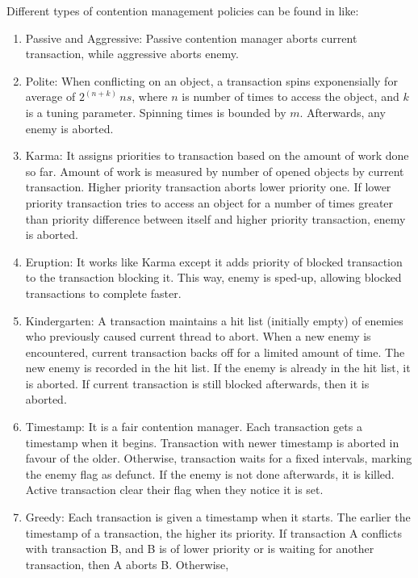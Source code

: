 \documentclass[12pt,english]{report}
\begin{document}
Different types of contention management policies can be found in
\cite{Scherer:2005:ACM:1073814.1073861,scherer2004contention,Spear:2009:CSC:1504176.1504199,springerlink:10.1007_11561927_23,Guerraoui:2005:TTT:1073814.1073863,Guerraoui:2006:TTT:1146381.1146429}
like:
\begin{enumerate}
\item Passive and Aggressive: Passive contention manager aborts current transaction,
while aggressive aborts enemy.
\item Polite: When conflicting on an object, a transaction spins exponensially
for average of $2^{(n+k)}\, ns$, where $n$ is number of times to
access the object, and $k$ is a tuning parameter. Spinning times
is bounded by $m$. Afterwards, any enemy is aborted.
\item Karma: It assigns priorities to transaction based on the amount of
work done so far. Amount of work is measured by number of opened objects
by current transaction. Higher priority transaction aborts lower priority
one. If lower priority transaction tries to access an object for a
number of times greater than priority difference between itself and
higher priority transaction, enemy is aborted.
\item Eruption: It works like Karma except it adds priority of blocked transaction
to the transaction blocking it. This way, enemy is sped-up, allowing
blocked transactions to complete faster.
\item Kindergarten: A transaction maintains a hit list (initially empty)
of enemies who previously caused current thread to abort. When a new
enemy is encountered, current transaction backs off for a limited
amount of time. The new enemy is recorded in the hit list. If the
enemy is already in the hit list, it is aborted. If current transaction
is still blocked afterwards, then it is aborted.
\item Timestamp: It is a fair contention manager. Each transaction gets
a timestamp when it begins. Transaction with newer timestamp is aborted
in favour of the older. Otherwise, transaction waits for a fixed intervals,
marking the enemy flag as defunct. If the enemy is not done afterwards,
it is killed. Active transaction clear their flag when they notice
it is set.
\item Greedy: Each transaction is given a timestamp when it starts. The
earlier the timestamp of a transaction, the higher its priority. If
transaction A conflicts with transaction B, and B is of lower priority
or is waiting for another transaction, then A aborts B. Otherwise,

\end{enumerate}
\end{document}

